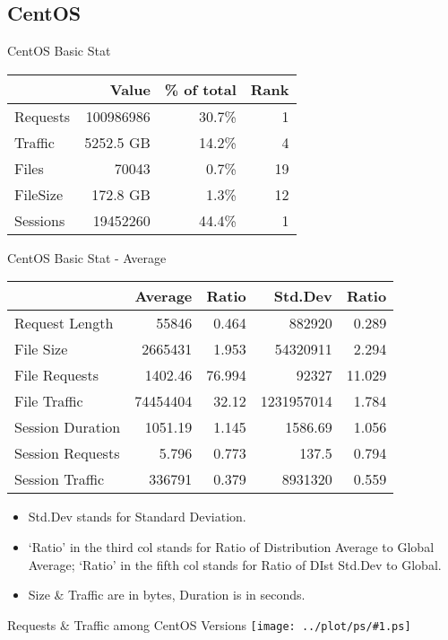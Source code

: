 \documentclass{beamer}
\newcommand\graph[1]{{\texttt{[image: ../plot/ps/\#1.ps]}}}
\begin{document}
\subsection{CentOS}

\begin{frame}{CentOS Basic Stat}
\begin{tabular}[t]{|l|r|r|r|}
\hline
 & Value & \% of total & Rank \\
\hline
Requests& 100986986 & 30.7\% & 1 \\
Traffic & 5252.5 GB & 14.2\% & 4 \\
Files 	& 70043 & 0.7\% & 19 \\
FileSize& 172.8 GB & 1.3\% & 12 \\
Sessions& 19452260 & 44.4\% & 1 \\
\hline
\end{tabular}
\end{frame}

\begin{frame}{CentOS Basic Stat - Average}
\begin{tabular}[t]{|l|r|r|r|r|}
\hline
 & Average & Ratio & Std.Dev & Ratio \\
\hline
Request Length	& 55846 & 0.464 & 882920 & 0.289 \\
File Size	& 2665431 & 1.953 & 54320911 & 2.294 \\
File Requests	& 1402.46 & 76.994 & 92327 & 11.029 \\
File Traffic	& 74454404 & 32.12 & 1231957014 & 1.784 \\
Session Duration& 1051.19 & 1.145 & 1586.69 & 1.056 \\
Session Requests& 5.796 & 0.773 & 137.5 & 0.794 \\
Session Traffic & 336791 & 0.379 & 8931320 & 0.559 \\
\hline
\end{tabular}
\begin{itemize}
  \item Std.Dev stands for Standard Deviation.
  \item `Ratio' in the third col stands for Ratio of Distribution Average to Global Average; `Ratio' in the fifth col stands for Ratio of DIst Std.Dev to Global.
  \item Size \& Traffic are in bytes, Duration is in seconds.
\end{itemize}
\end{frame}

\begin{frame}{Requests \& Traffic among CentOS Versions}
\graph{dist-subdir-centos}
\end{frame}
\end{document}
